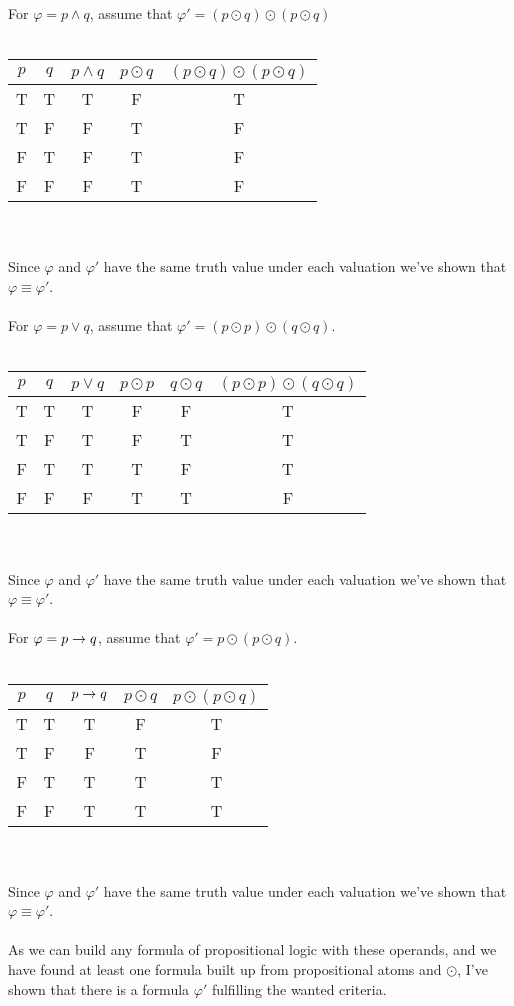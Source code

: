 \documentclass[12pt,oneside,reqno]{amsart}
\begin{document}
For $\varphi = p \land q$, assume that $\varphi' = (p \odot q) \odot (p \odot q)$\\\\
	\begin{tabular}{ cc|c|c|c }
		$p$ & $q$ & $p \land q$ & $ p \odot q$ & $(p \odot q) \odot (p \odot q)$ \\ \hline
		T & T & 	T & F & T \\
		T & F & 	F & T & F \\
		F & T & 	F & T & F \\
		F & F & 	F & T & F \\
	\end{tabular}\\\\
Since $\varphi$ and $\varphi'$ have the same truth value under each valuation we've shown that $\varphi \equiv \varphi'$.\\\\
\newpage
For $\varphi = p \lor q$, assume that $\varphi' = (p \odot p) \odot (q \odot q)$.\\\\
	\begin{tabular}{ cc|c|c|c|c }
		$p$ & $q$ & $p \lor q$ & $p \odot p$ & $q \odot q$ & $(p \odot p) \odot (q \odot q)$\\ \hline
		T & T & 	T & F & F & T \\
		T & F & 	T & F & T & T \\
		F & T & 	T & T & F & T \\
		F & F & 	F & T & T & F \\
	\end{tabular}\\\\
Since $\varphi$ and $\varphi'$ have the same truth value under each valuation we've shown that $\varphi \equiv \varphi'$.\\\\

For $\varphi = p \rightarrow{} q$, assume that $\varphi' = p \odot (p \odot q)$.\\\\
	\begin{tabular}{ cc|c|c|c }
		$p$ & $q$ & $p \rightarrow{} q$ & $ p \odot q$ & $p \odot (p \odot q)$ \\ \hline
		T & T & 	T & F & T \\
		T & F & 	F & T & F \\
		F & T & 	T & T & T \\
		F & F & 	T & T & T \\
	\end{tabular}\\\\
Since $\varphi$ and $\varphi'$ have the same truth value under each valuation we've shown that $\varphi \equiv \varphi'$.\\\\

As we can build any formula of propositional logic with these operands, and we have found at least one formula built up from propositional atoms and $\odot$, I've shown that there is a formula $\varphi'$ fulfilling the wanted criteria.
\end{document}
